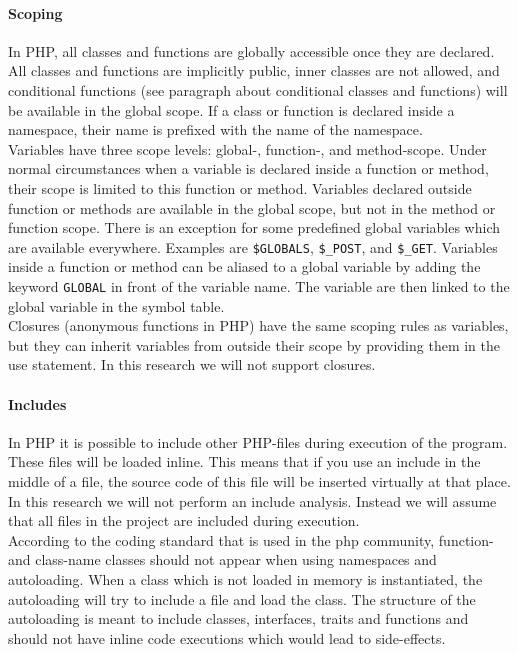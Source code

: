 \documentclass[../main.tex]{subfiles}
\begin{document}
    \paragraph{Scoping}
    In PHP, all classes and functions are globally accessible once they are declared.
    All classes and functions are implicitly public, inner classes are not allowed, and conditional functions (see paragraph about conditional classes and functions) will be available in the global scope.
    If a class or function is declared inside a namespace, their name is prefixed with the name of the namespace.
    \\
    Variables have three scope levels: global-, function-, and method-scope.
    Under normal circumstances when a variable is declared inside a function or method, their scope is limited to this function or method.
    Variables declared outside function or methods are available in the global scope, but not in the method or function scope.
    There is an exception for some predefined global variables which are available everywhere. 
    Examples are \texttt{\$GLOBALS}, \texttt{\$\_POST}, and \texttt{\$\_GET}. 
    Variables inside a function or method can be aliased to a global variable by adding the keyword \texttt{GLOBAL} in front of the variable name.
    The variable are then linked to the global variable in the symbol table\footnotemark.
    \\
    Closures (anonymous functions in PHP) have the same scoping rules as variables, but they can inherit variables from outside their scope by providing them in the use statement. 
    In this research we will not support closures. 
    
    \paragraph{Includes}
    In PHP it is possible to include other PHP-files during execution of the program. 
    These files will be loaded inline. 
    This means that if you use an include in the middle of a file, the source code of this file will be inserted virtually at that place.
    In this research we will not perform an include analysis.
    Instead we will assume that all files in the project are included during execution. 
    \\
    According to the coding standard that is used in the php community\footnotemark, function- and class-name classes should not appear when using namespaces and autoloading.
    When a class which is not loaded in memory is instantiated, the autoloading will try to include a file and load the class.
    The structure of the autoloading is meant to include classes, interfaces, traits and functions and should not have inline code executions which would lead to side-effects.
    
\end{document}
